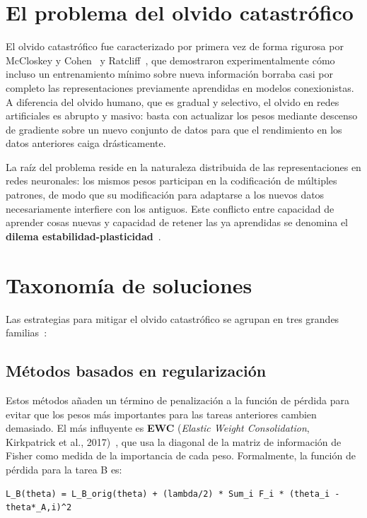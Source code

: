 
\section{El problema del olvido catastrófico}

El olvido catastrófico fue caracterizado por primera vez de forma rigurosa por McCloskey y
Cohen~\cite{ref1} y Ratcliff~\cite{ref7}, que demostraron experimentalmente cómo incluso un
entrenamiento mínimo sobre nueva información borraba casi por completo las representaciones
previamente aprendidas en modelos conexionistas. A diferencia del olvido humano, que es gradual y
selectivo, el olvido en redes artificiales es abrupto y masivo: basta con actualizar los pesos
mediante descenso de gradiente sobre un nuevo conjunto de datos para que el rendimiento en los datos
anteriores caiga drásticamente.

La raíz del problema reside en la naturaleza distribuida de las representaciones en redes
neuronales: los mismos pesos participan en la codificación de múltiples patrones, de modo que su
modificación para adaptarse a los nuevos datos necesariamente interfiere con los antiguos. Este
conflicto entre capacidad de aprender cosas nuevas y capacidad de retener las ya aprendidas se
denomina el \textbf{dilema estabilidad-plasticidad}~\cite{ref8}.

\section{Taxonomía de soluciones}

Las estrategias para mitigar el olvido catastrófico se agrupan en tres grandes familias~\cite{ref9}:

\subsection{Métodos basados en regularización}

Estos métodos añaden un término de penalización a la función de pérdida para evitar que los pesos
más importantes para las tareas anteriores cambien demasiado. El más influyente es \textbf{EWC}
(\textit{Elastic Weight Consolidation}, Kirkpatrick et al., 2017)~\cite{ref4}, que usa la diagonal
de la matriz de información de Fisher como medida de la importancia de cada peso. Formalmente, la
función de pérdida para la tarea B es:

\begin{lstlisting}
L_B(theta) = L_B_orig(theta) + (lambda/2) * Sum_i F_i * (theta_i - theta*_A,i)^2
\end{lstlisting}

